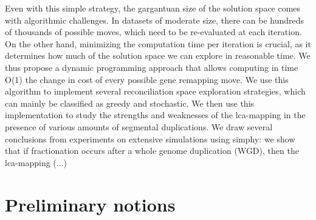 \documentclass[10pt]{article}
\makeatletter
\newcommand{\problemtitle}[1]{\gdef\@problemtitle{#1}}%
\newcommand{\probleminput}[1]{\gdef\@probleminput{#1}}%
\newcommand{\problemquestion}[1]{\gdef\@problemquestion{#1}}%
\makeatother
\begin{document}
Even with this simple strategy, the gargantuan size of the solution space comes with algorithmic challenges.  In datasets of moderate size, there can be hundreds of thousands of possible moves, which need to be re-evaluated at each iteration.  On the other hand, minimizing the computation time per iteration is crucial, as it determines how much of the solution space we can explore in reasonable time. 
We thus propose a dynamic programming approach that allows computing in time O(1) the change in cost of every possible gene remapping move.  We use this algorithm to implement several reconciliation space exploration strategies, which can mainly be classified as greedy and stochastic.  We then use this implementation to study the strengths and weaknesses of the lca-mapping in the presence of various amounts of segmental duplications. 
We draw several conclusions from experiments on extensive simulations using simphy: we show that if fractionation occurs after a whole genome duplication (WGD), then the lca-mapping (...)








\section{Preliminary notions}
\end{document}
